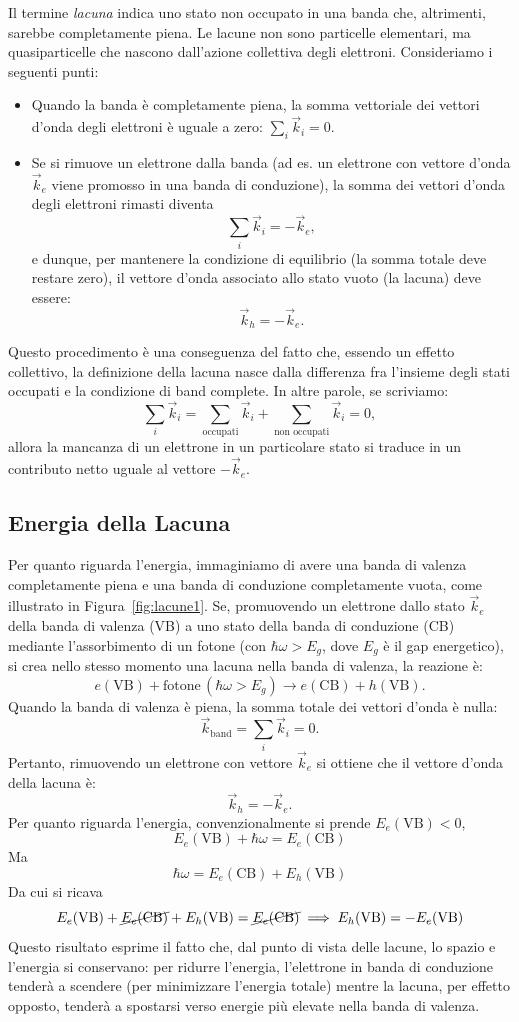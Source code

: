 Il termine \emph{lacuna} indica uno stato non occupato in una banda che, altrimenti, sarebbe completamente piena. Le lacune non sono particelle elementari, ma quasiparticelle che nascono dall'azione collettiva degli elettroni. Consideriamo i seguenti punti:
\begin{itemize}
    \item Quando la banda è completamente piena, la somma vettoriale dei vettori d'onda degli elettroni è uguale a zero: \(\sum_i \vec{k}_i = 0\).
    \item Se si rimuove un elettrone dalla banda (ad es. un elettrone con vettore d'onda \(\vec{k}_e\) viene promosso in una banda di conduzione), la somma dei vettori d'onda degli elettroni rimasti diventa
    \[
    \sum_i \vec{k}_i = -\vec{k}_e,
    \]
    e dunque, per mantenere la condizione di equilibrio (la somma totale deve restare zero), il vettore d'onda associato allo stato vuoto (la lacuna) deve essere:
    \[
    \vec{k}_h = -\vec{k}_e.
    \]
\end{itemize}
Questo procedimento è una conseguenza del fatto che, essendo un effetto collettivo, la definizione della lacuna nasce dalla differenza fra l'insieme degli stati occupati e la condizione di band complete. In altre parole, se scriviamo:
\[
\sum_i \vec{k}_i = \sum_{\text{occupati}} \vec{k}_i + \sum_{\text{non occupati}} \vec{k}_i = 0,
\]
allora la mancanza di un elettrone in un particolare stato si traduce in un contributo netto uguale al vettore \(-\vec{k}_e\).

\subsection*{Energia della Lacuna}
Per quanto riguarda l'energia, immaginiamo di avere una banda di valenza completamente piena e una banda di conduzione completamente vuota, come illustrato in Figura~\ref{fig:lacune1}. Se, promuovendo un elettrone dallo stato \(\vec{k}_e\) della banda di valenza (VB) a uno stato della banda di conduzione (CB) mediante l'assorbimento di un fotone (con \(\hbar\omega > E_g\), dove \(E_g\) è il gap energetico), si crea nello stesso momento una lacuna nella banda di valenza, la reazione è:
\[
e(\text{VB}) + \text{fotone}\, (\hbar\omega > E_g) \to e(\text{CB}) + h(\text{VB}).
\]
Quando la banda di valenza è piena, la somma totale dei vettori d'onda è nulla:
\[
\vec{k}_{\text{band}} = \sum_i \vec{k}_i = 0.
\]
Pertanto, rimuovendo un elettrone con vettore \(\vec{k}_e\) si ottiene che il vettore d'onda della lacuna è:
\[
\vec{k}_h = -\vec{k}_e.
\]
Per quanto riguarda l'energia, convenzionalmente si prende $E_e(\text{VB}) < 0$,
\[ E_e(\text{VB}) + \hbar\omega = E_e(\text{CB})\]
Ma
\[\hbar\omega = E_e(\text{CB}) + E_h(\text{VB}) \]
Da cui si ricava 
\[E_e(\text{VB})+ \cancel{E_e(\text{CB})} + E_h(\text{VB}) = \cancel{E_e(\text{CB})}
    \implies E_h(\text{VB}) = - E_e (\text{VB})\]
Questo risultato esprime il fatto che, dal punto di vista delle lacune, lo spazio e l'energia si conservano: per ridurre l'energia, l'elettrone in banda di conduzione tenderà a scendere (per minimizzare l'energia totale) mentre la lacuna, per effetto opposto, tenderà a spostarsi verso energie più elevate nella banda di valenza.


